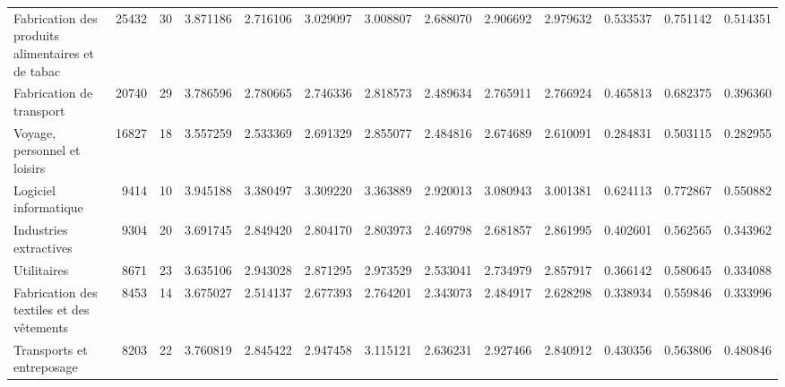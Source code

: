 \begin{tabular}{lrrrrrrrrrrrr}
Fabrication des produits alimentaires et de tabac  &         25432 &             30 &     3.871186 &              2.716106 &            3.029097 &                 3.008807 &               2.688070 &                  2.906692 &                   2.979632 &                   0.533537 &  0.751142 &             0.514351 \\
Fabrication de transport                           &         20740 &             29 &     3.786596 &              2.780665 &            2.746336 &                 2.818573 &               2.489634 &                  2.765911 &                   2.766924 &                   0.465813 &  0.682375 &             0.396360 \\
Voyage, personnel et loisirs                       &         16827 &             18 &     3.557259 &              2.533369 &            2.691329 &                 2.855077 &               2.484816 &                  2.674689 &                   2.610091 &                   0.284831 &  0.503115 &             0.282955 \\
Logiciel informatique                              &          9414 &             10 &     3.945188 &              3.380497 &            3.309220 &                 3.363889 &               2.920013 &                  3.080943 &                   3.001381 &                   0.624113 &  0.772867 &             0.550882 \\
Industries extractives                             &          9304 &             20 &     3.691745 &              2.849420 &            2.804170 &                 2.803973 &               2.469798 &                  2.681857 &                   2.861995 &                   0.402601 &  0.562565 &             0.343962 \\
Utilitaires                                        &          8671 &             23 &     3.635106 &              2.943028 &            2.871295 &                 2.973529 &               2.533041 &                  2.734979 &                   2.857917 &                   0.366142 &  0.580645 &             0.334088 \\
Fabrication des textiles et des vêtements          &          8453 &             14 &     3.675027 &              2.514137 &            2.677393 &                 2.764201 &               2.343073 &                  2.484917 &                   2.628298 &                   0.338934 &  0.559846 &             0.333996 \\
Transports et entreposage                          &          8203 &             22 &     3.760819 &              2.845422 &            2.947458 &                 3.115121 &               2.636231 &                  2.927466 &                   2.840912 &                   0.430356 &  0.563806 &             0.480846 \\

\end{tabular}

